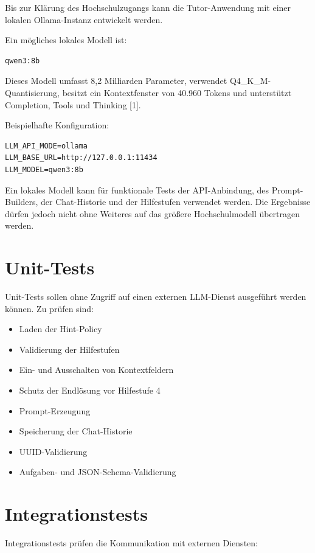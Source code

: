 \documentclass[11pt,a4paper,oneside,ngerman]{memoir}
\begin{document}
Bis zur Klärung des Hochschulzugangs kann die Tutor-Anwendung mit einer lokalen Ollama-Instanz entwickelt werden.

Ein mögliches lokales Modell ist:

\begin{verbatim}
qwen3:8b
\end{verbatim}

Dieses Modell umfasst 8,2 Milliarden Parameter, verwendet Q4\_K\_M-Quantisierung, besitzt ein Kontextfenster von 40.960 Tokens und unterstützt Completion, Tools und Thinking [1].

Beispielhafte Konfiguration:

\begin{verbatim}
LLM_API_MODE=ollama
LLM_BASE_URL=http://127.0.0.1:11434
LLM_MODEL=qwen3:8b
\end{verbatim}

Ein lokales Modell kann für funktionale Tests der API-Anbindung, des Prompt-Builders, der Chat-Historie und der Hilfestufen verwendet werden. Die Ergebnisse dürfen jedoch nicht ohne Weiteres auf das größere Hochschulmodell übertragen werden.

\section{Unit-Tests}

Unit-Tests sollen ohne Zugriff auf einen externen LLM-Dienst ausgeführt werden können. Zu prüfen sind:

\begin{itemize}
    \item Laden der Hint-Policy
    \item Validierung der Hilfestufen
    \item Ein- und Ausschalten von Kontextfeldern
    \item Schutz der Endlösung vor Hilfestufe 4
    \item Prompt-Erzeugung
    \item Speicherung der Chat-Historie
    \item UUID-Validierung
    \item Aufgaben- und JSON-Schema-Validierung
\end{itemize}

\section{Integrationstests}

Integrationstests prüfen die Kommunikation mit externen Diensten:
\end{document}
